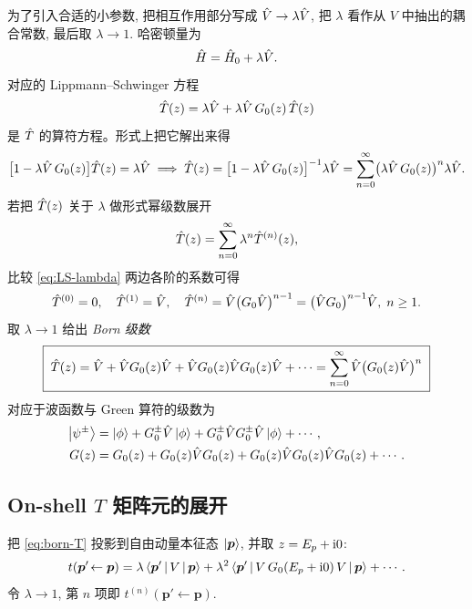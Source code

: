 为了引入合适的小参数, 把相互作用部分写成 $\hat{V}\to\lambda\hat{V}$, 把 $\lambda$ 看作从 $V$ 中抽出的耦合常数, 最后取 $\lambda\to 1$. 哈密顿量为
\begin{equation}
\hat{H}=\hat{H}_0+\lambda\hat{V}.
\end{equation}
对应的 Lippmann--Schwinger 方程
\begin{equation}
\hat{T}(z)=\lambda\hat{V}+\lambda\hat{V}\,G_0(z)\,\hat{T}(z)
\label{eq:LS-lambda}
\end{equation}
是 $\hat{T}$ 的算符方程。形式上把它解出来得
\begin{equation}
\bigl[1-\lambda\hat{V}\,G_0(z)\bigr]\hat{T}(z)=\lambda\hat{V}
\;\Longrightarrow\;
\hat{T}(z)=\bigl[1-\lambda\hat{V}\,G_0(z)\bigr]^{-1}\lambda\hat{V}
=\sum_{n=0}^{\infty}\bigl(\lambda\hat{V}\,G_0(z)\bigr)^{n}\lambda\hat{V}.
\label{eq:born-T}
\end{equation}
若把 $\hat{T}(z)$ 关于 $\lambda$ 做形式幂级数展开
\begin{equation}
\hat{T}(z)=\sum_{n=0}^{\infty}\lambda^{n}\hat{T}^{(n)}(z),
\end{equation}
比较 \eqref{eq:LS-lambda} 两边各阶的系数可得
\begin{equation}
\hat{T}^{(0)}=0,\quad \hat{T}^{(1)}=\hat{V},\quad
\hat{T}^{(n)}=\hat{V}\bigl(G_0\hat{V}\bigr)^{n-1}=\bigl(\hat{V} G_0\bigr)^{n-1}\hat{V},\;n\ge 1.
\end{equation}
取 $\lambda\to 1$ 给出 \emph{Born 级数}
\begin{equation}
\boxed{\;\hat{T}(z)=\hat{V}+\hat{V} G_0(z)\hat{V}+\hat{V} G_0(z)\hat{V} G_0(z)\hat{V}+\cdots
=\sum_{n=0}^{\infty}\hat{V}\bigl(G_0(z)\hat{V}\bigr)^{n}\;}
\label{eq:born-series}
\end{equation}
对应于波函数与 Green 算符的级数为
\begin{align}
\ket{\psi^{\pm}}&=\ket{\phi}+G_0^{\pm}\hat{V}\ket{\phi}+G_0^{\pm}\hat{V} G_0^{\pm}\hat{V}\ket{\phi}+\cdots,\\
G(z)&=G_0(z)+G_0(z)\hat{V} G_0(z)+G_0(z)\hat{V} G_0(z)\hat{V} G_0(z)+\cdots .
\end{align}

\subsection{On-shell $T$ 矩阵元的展开}

把 \eqref{eq:born-T} 投影到自由动量本征态 $\ket{\bm p}$, 并取 $z=E_p+\mathrm{i} 0$:
\begin{equation}
t(\bm p'\!\leftarrow\bm p)
=\lambda\left\langle \bm p' \,\middle|\, V \,\middle|\, \bm p \right\rangle
+\lambda^{2}\left\langle \bm p' \,\middle|\, V\,G_0(E_p+\mathrm{i} 0)\,V \,\middle|\, \bm p \right\rangle+\cdots .
\label{eq:T-expansion}
\end{equation}
令 $\lambda\to 1$, 第 $n$ 项即 $t^{(n)}(\bm p'\!\leftarrow\bm p)$.

